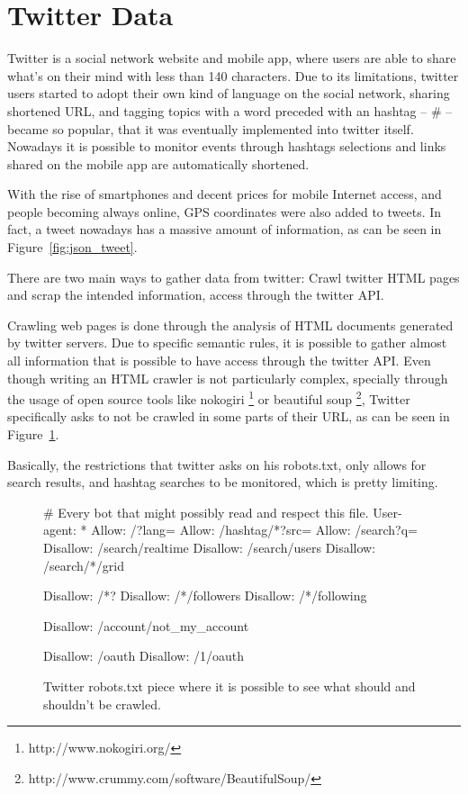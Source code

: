 \label{ch:clustering_tweets}

\section{Twitter Data}
\label{sec:crawling_twitter}
Twitter is a social network website and mobile app, where users are able to share what's on their mind with less than 140 characters. Due to its limitations, twitter users started to adopt their own kind of language on the social network, sharing shortened \ac{URL}, and tagging topics with a word preceded with an hashtag -- \# -- became so popular, that it was eventually implemented into twitter itself. Nowadays it is possible to monitor events through hashtags selections and links shared on the mobile app are automatically shortened.   

With the rise of smartphones and decent prices for mobile Internet access, and people becoming always online, GPS coordinates were also added to tweets. In fact, a tweet nowadays has a massive amount of information, as can be seen in Figure~\ref{fig:json_tweet}.


There are two main ways to gather data from twitter: Crawl twitter HTML pages and scrap the intended information, access through the twitter API.

Crawling web pages is done through the analysis of HTML documents generated by twitter servers. Due to specific semantic rules, it is possible to gather almost all information that is possible to have access through the twitter API. Even though writing an HTML crawler is not particularly complex, specially through the usage of open source tools like nokogiri \footnote{http://www.nokogiri.org/} or beautiful soup \footnote{http://www.crummy.com/software/BeautifulSoup/}, Twitter specifically asks to not be crawled in some parts of their \ac{URL}, as can be seen in Figure~\ref{fig:twitterrobots}. 

Basically, the restrictions that twitter asks on his robots.txt, only allows for search results, and hashtag searches to be monitored, which is pretty limiting.

\begin{figure}[htpb]
  \centering
  \begin{boxedverbatim}
  # Every bot that might possibly read and respect this file.
  User-agent: *
  Allow: /?lang=
  Allow: /hashtag/*?src=
  Allow: /search?q=%
  Disallow: /search/realtime
  Disallow: /search/users
  Disallow: /search/*/grid

  Disallow: /*?
  Disallow: /*/followers
  Disallow: /*/following

  Disallow: /account/not_my_account

  Disallow: /oauth
  Disallow: /1/oauth
  \end{boxedverbatim}
  \caption{Twitter robots.txt piece where it is possible to see what should and shouldn't be crawled.}
  \label{fig:twitterrobots}
\end{figure}

